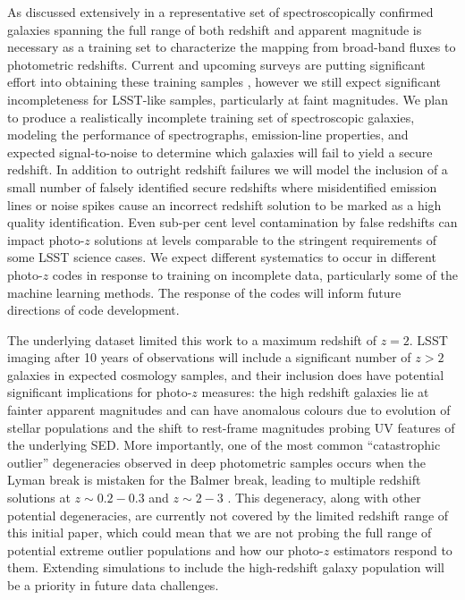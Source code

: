 As discussed extensively in \citet{Newman:2015} a representative set of spectroscopically confirmed galaxies spanning the full range of both redshift and apparent magnitude is necessary as a training set to characterize the mapping from broad-band fluxes to photometric redshifts.
Current and upcoming surveys are putting significant effort into obtaining these training samples \citep[e.~g.\,][]{Masters:2017}, however we still expect significant incompleteness for LSST-like samples, particularly at faint magnitudes.
We plan to produce a realistically incomplete training set of spectroscopic galaxies, modeling the performance of spectrographs, emission-line properties, and expected signal-to-noise to determine which galaxies will fail to yield a secure redshift.
In addition to outright redshift failures we will model the inclusion of a small number of falsely identified secure redshifts where misidentified emission lines or noise spikes cause an incorrect redshift solution to be marked as a high quality identification.
Even sub-per cent level contamination by false redshifts can impact photo-$z$ solutions at levels comparable to the stringent  requirements of some LSST science cases.
We expect different systematics to occur in different photo-$z$ codes in response to training on incomplete data, particularly some of the machine learning methods.
The response of the codes will inform future directions of code development.

The underlying dataset limited this work to a maximum redshift of $z=2$.
LSST imaging after 10 years of observations will include a significant number of $z>2$ galaxies in expected cosmology samples, and their inclusion does have potential significant implications for photo-$z$ measures: the high redshift galaxies lie at fainter apparent magnitudes and can have anomalous colours due to evolution of stellar populations and the shift to rest-frame magnitudes probing UV features of the underlying SED.
More importantly, one of the most common ``catastrophic outlier'' degeneracies observed in deep photometric samples occurs when the Lyman break is mistaken for the Balmer break, leading to multiple redshift solutions at $z\sim0.2-0.3$ and $z\sim2-3$ \citep{Massarotti:2001}.
This degeneracy, along with other potential degeneracies, are currently not covered by the limited redshift range of this initial paper, which could mean that we are not probing the full range of potential extreme outlier populations and how our photo-$z$ estimators respond to them.
Extending simulations to include the high-redshift galaxy population will be a priority in future data challenges.

